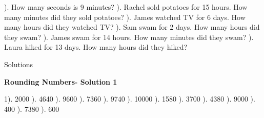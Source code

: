 \documentclass{article}%
\begin{document}
\newline%
). How many seconds is 9 minutes?%
\newline%
\newline%
). Rachel sold potatoes for 15 hours. How many minutes did they sold potatoes?%
\newline%
\newline%
). James watched TV for 6 days. How many hours did they watched TV?%
\newline%
\newline%
). Sam swam for 2 days. How many hours did they swam?%
\newline%
\newline%
). James swam for 14 hours. How many minutes did they swam?%
\newline%
\newline%
). Laura hiked for 13 days. How many hours did they hiked?%
\newline%
\newline%
\newline%
\pagebreak%
\huge%
\vspace*{\fill}%
\begin{center}%
Solutions%
\end{center}%
\vspace*{\fill}%
\normalsize%
\pagebreak%
\large%
\begin{center}%
\textbf{Rounding Numbers- Solution 1}%
\newline%
\end{center} \normalsize%
1). 2000%
). 4640%
). 9600%
). 7360%
). 9740%
). 10000%
). 1580%
). 3700%
). 4380%
). 9000%
). 400%
). 7380%
). 600%
\end{document}
